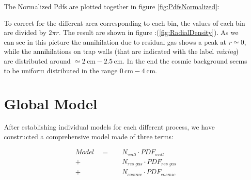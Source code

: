 \documentclass[11pt,a4paper,oneside]{article}
\begin{document}
The Normalized Pdfs are plotted together in figure \ref{fig:PdfsNormalized}:
\begin{figure}[!hbtp]
\centering
{}
\end{figure}

To correct for the different area corresponding to each bin, the values of each bin are divided by $ 2 \pi r$. The result are shown in figure :(\ref{fig:RadialDensity}). As we can see in this picture the annihilation due to residual gas shows a peak at $r \simeq 0$, while the annihilations on trap walls (that are indicated with the label \textit{mixing}) are distributed around $\simeq \SI{2}{ \centi \meter} - \SI{2.5}{\centi \meter}$. In the end the cosmic background seems to be uniform distributed in the range $\SI{0}{\centi \meter} - \SI{4}{\centi \meter}$.
\section*{Global Model}

After establishing individual models for each different process, we have constructed a comprehensive model made of three terms:

\begin{equation} \label{eq:GlobalModel}
\begin{split}
Model \quad = \quad &N_{wall} \cdot PDF_{wall} \\
	+ &N_{res \; gas} \cdot PDF_{res \; gas}\\ 
	+ &N_{cosmic} \cdot PDF_{cosmic}
\end{split} 
\end{equation} 
\end{document}
